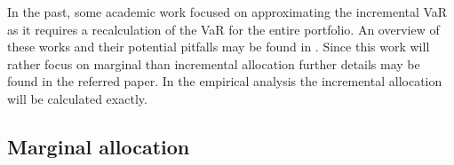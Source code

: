 \documentclass[../Thesis_AHoecherl.tex]{subfiles}
\begin{document}
In the past, some academic work focused on approximating the incremental VaR as it requires a recalculation of the VaR for the entire portfolio. An overview of these works and their potential pitfalls may be found in \cite{tibiletti2001incremental}. Since this work will rather focus on marginal than incremental allocation further details may be found in the referred paper. In the empirical analysis the incremental allocation will be calculated exactly.

\subsection{Marginal allocation}
\end{document}
